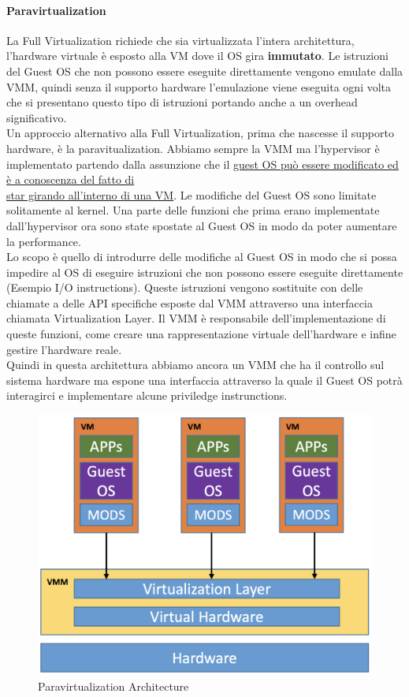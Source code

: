 \documentclass{article}
\begin{document}
\paragraph{Paravirtualization}
La Full Virtualization richiede che sia virtualizzata l'intera architettura, l'hardware virtuale è esposto alla VM dove il OS gira \textbf{immutato}. Le istruzioni del Guest OS che non possono essere eseguite direttamente vengono emulate dalla VMM, quindi senza il supporto hardware l'emulazione viene eseguita ogni volta che si presentano questo tipo di istruzioni portando anche a un overhead significativo.\\
Un approccio alternativo alla Full Virtualization, prima che nascesse il supporto hardware, è la paravitualization. Abbiamo sempre la VMM ma l'hypervisor è implementato partendo dalla assunzione che il \underline{guest OS può essere modificato ed è a conoscenza del fatto di}\\ \underline{star girando all'interno di una VM}. Le modifiche del Guest OS sono limitate solitamente al kernel. Una parte delle funzioni che prima erano implementate dall'hypervisor ora sono state spostate al Guest OS in modo da poter aumentare la performance.\\
Lo scopo è quello di introdurre delle modifiche al Guest OS in modo che si possa impedire al OS di eseguire istruzioni che non possono essere eseguite direttamente (Esempio I/O instructions). Queste istruzioni vengono sostituite con delle chiamate a delle API specifiche esposte dal VMM attraverso una interfaccia chiamata Virtualization Layer. Il VMM è responsabile dell'implementazione di queste funzioni, come creare una rappresentazione virtuale dell'hardware e infine gestire l'hardware reale.\\
Quindi in questa architettura abbiamo ancora un VMM che ha il controllo sul sistema hardware ma espone una interfaccia attraverso la quale il Guest OS potrà interagirci e implementare alcune priviledge instrunctions.\\
\begin{figure}[H]
    \centering
    \includegraphics[scale=0.3]{img/Virt_tech/17.png}
    \caption{Paravirtualization Architecture}
\end{figure}
\end{document}
